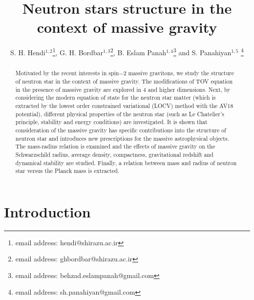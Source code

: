 \documentclass[aps]{revtex4}
\begin{document}
\title{Neutron stars structure in the context of massive gravity}
\author{S. H. Hendi$^{1,2}$\footnote{%
email address: hendi@shirazu.ac.ir}, G. H. Bordbar$^{1,3}$\footnote{%
email address: ghbordbar@shirazu.ac.ir}, B. Eslam Panah$^{1,4}$\footnote{%
email address: behzad.eslampanah@gmail.com} and S. Panahiyan$^{1,5}$ \footnote{%
email address: sh.panahiyan@gmail.com} } 

\begin{abstract}
Motivated by the recent interests in spin$-2$ massive gravitons,
we study the structure of neutron star in the context of massive
gravity. The modifications of TOV equation in the presence of
massive gravity are explored in $4$ and higher dimensions. Next,
by considering the modern equation of state for the neutron star
matter (which is extracted by the lowest order constrained
variational (LOCV) method with the AV$18$ potential), different
physical properties of the neutron star (such as Le Chatelier's
principle, stability and energy conditions) are investigated. It
is shown that consideration of the massive gravity has specific
contributions into the structure of neutron star and introduces
new prescriptions for the massive astrophysical objects. The
mass-radius relation is examined and the effects of massive
gravity on the Schwarzschild radius, average density, compactness,
gravitational redshift and dynamical stability are studied.
Finally, a relation between mass and radius of neutron star versus
the Planck mass is extracted.
\end{abstract}

\maketitle

\section{Introduction}
\end{document}

